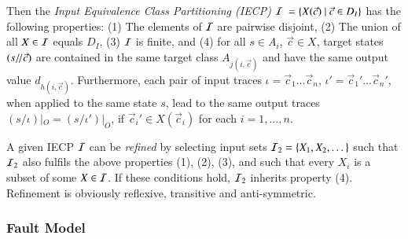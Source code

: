 Then the {\it Input Equivalence Class Partitioning (IECP)}
${\cal I} = \{X(\vec c)~|~\vec c\in D_I\}$ has the following properties: (1) The elements of ${\cal I}$
are pairwise disjoint, (2) The union of all $X\in {\cal I}$ equals $D_I$, (3) ${\cal I}$ is finite,
and (4) for all $s\in A_i$, $\vec c\in X$, target states $(s/\!/\vec c)$ are contained in the same target class $A_{j(i,\vec c)}$ and have the same output value $d_{h(i,\vec c)}$. Furthermore, each pair of input traces $\iota = \vec c_1\dots\vec c_n$, $\iota'= \vec c_1'\dots\vec c_n'$, when applied to the same state $s$, lead to the same output traces $(s/\iota)|_O = (s/\iota')|_O$, if
$\vec c_i' \in X(\vec c_i)$ for each $i=1,\dots,n$.  

A given IECP ${\cal I}$ can be {\it refined} by selecting input sets 
${\cal I}_2 = \{ X_1,X_2,\dots\}$ such that
${\cal I}_2$  also fulfils the above properties (1), (2), (3), and such that every $X_i$ is a subset of  
 some $X\in {\cal I}$. If these conditions hold, ${\cal I}_2$ inherits property (4). Refinement is obviously reflexive, transitive and anti-symmetric.

\subsubsection{Fault Model}\label{sec:faultmodel}

